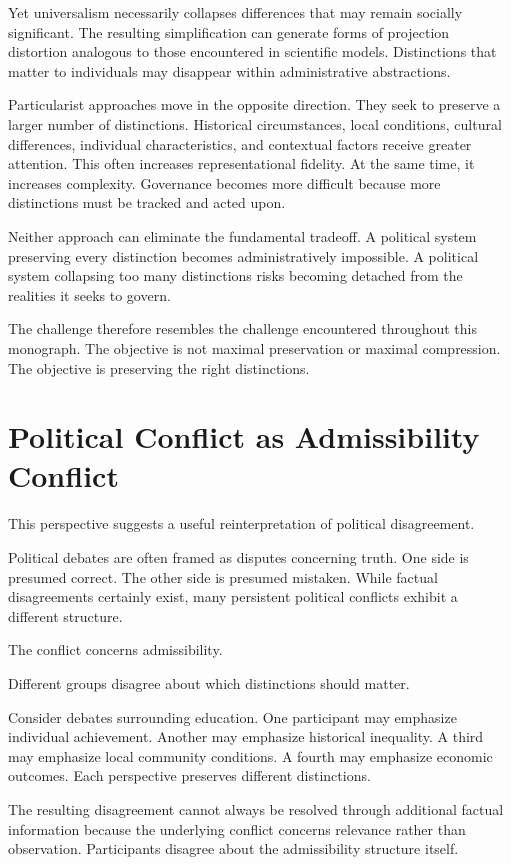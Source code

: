 \documentclass[11pt,oneside,openany]{book}
\begin{document}
Yet universalism necessarily collapses differences that may remain socially significant. The resulting simplification can generate forms of projection distortion analogous to those encountered in scientific models. Distinctions that matter to individuals may disappear within administrative abstractions.

Particularist approaches move in the opposite direction. They seek to preserve a larger number of distinctions. Historical circumstances, local conditions, cultural differences, individual characteristics, and contextual factors receive greater attention. This often increases representational fidelity. At the same time, it increases complexity. Governance becomes more difficult because more distinctions must be tracked and acted upon.

Neither approach can eliminate the fundamental tradeoff. A political system preserving every distinction becomes administratively impossible. A political system collapsing too many distinctions risks becoming detached from the realities it seeks to govern.

The challenge therefore resembles the challenge encountered throughout this monograph. The objective is not maximal preservation or maximal compression. The objective is preserving the right distinctions.

\section{Political Conflict as Admissibility Conflict}

This perspective suggests a useful reinterpretation of political disagreement.

Political debates are often framed as disputes concerning truth. One side is presumed correct. The other side is presumed mistaken. While factual disagreements certainly exist, many persistent political conflicts exhibit a different structure.

The conflict concerns admissibility.

Different groups disagree about which distinctions should matter.

Consider debates surrounding education. One participant may emphasize individual achievement. Another may emphasize historical inequality. A third may emphasize local community conditions. A fourth may emphasize economic outcomes. Each perspective preserves different distinctions.

The resulting disagreement cannot always be resolved through additional factual information because the underlying conflict concerns relevance rather than observation. Participants disagree about the admissibility structure itself.
\end{document}
